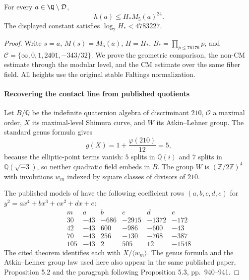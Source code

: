 \begin{theorem}\label{hyp:o8-height}
For every $a\in\Q\setminus\mathcal D$,
\[
 h(a)\le H_*M_5(a)^{24}.
\]
The displayed constant satisfies $\log_2H_*<4783227$.
\end{theorem}
\begin{proof}
Write $s=a$, $M(s)=M_5(a)$, $H=H_*$,
$B_*=\prod_{p\le76176}p$, and
$\mathcal C=\{\infty,0,1,2401,-343/32\}$.
We prove the geometric comparison, the non-CM estimate through the
modular level, and the CM estimate over the same fiber field.
All heights use the original stable Faltings normalization.
\paragraph{Recovering the contact line from published quotients}
Let $B/\mathbb Q$ be the indefinite quaternion algebra of discriminant $210$,
$\mathcal O$ a maximal order, $X$ its maximal-level Shimura curve, and $W$
its Atkin--Lehner group. The standard genus formula gives
\[
 g(X)=1+\frac{\varphi(210)}{12}=5,
\]
because the elliptic-point terms vanish: $5$ splits in $\mathbb Q(i)$ and
$7$ splits in $\mathbb Q(\sqrt{-3})$, so neither quadratic field embeds in
$B$. The group $W$ is $(\mathbb Z/2\mathbb Z)^4$ with involutions $w_m$
indexed by square classes of divisors of $210$.

The published models of \cite[Theorem 4.2 and Table 2, pp.~938--939]{GonzalezRotger2006} have the following coefficient rows
$(a,b,c,d,e)$ for $y^2=ax^4+bx^3+cx^2+dx+e$:
\[
\begin{array}{c|rrrrr}
 m&a&b&c&d&e\\\hline
30&-43&-686&-2915&-1372&-172\\
42&-43&600&-986&-600&-43\\
70&-43&256&-130&-768&-387\\
105&-43&2&505&12&-1548
\end{array}
\]
The cited theorem identifies each with $X/\langle w_m\rangle$.
The genus formula and the Atkin--Lehner group law used here also appear
in the same published paper, Proposition 5.2 and the paragraph following
Proposition 5.3, pp.~940--941.


\end{proof}
